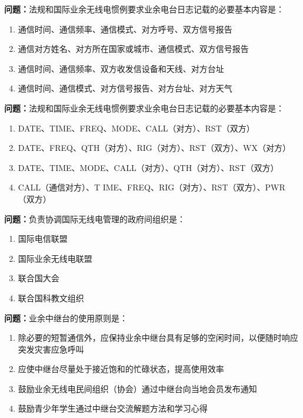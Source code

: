 \bigskip


\noindent\textbf{问题：}法规和国际业余无线电惯例要求业余电台日志记载的必要基本内容是：
\begin{enumerate}[label=\Alph*), leftmargin=3em]
\item 通信时间、通信频率、通信模式、对方呼号、双方信号报告
\item 通信对方姓名、对方所在国家或城市、通信模式、双方信号报告
\item 通信时间、通信频率、双方收发信设备和天线、对方台址
\item 通信时间、通信模式、对方信号报告、对方台址、对方天气
\end{enumerate}

\bigskip


\noindent\textbf{问题：}法规和国际业余无线电惯例要求业余电台日志记载的必要基本内容是：
\begin{enumerate}[label=\Alph*), leftmargin=3em]
\item DATE、TIME、FREQ、MODE、CALL（对方）、RST（双方）
\item DATE、FREQ、QTH（对方）、RIG（对方）、RST（双方）、WX（对方）
\item DATE、TIME、MODE、CALL（对方）、QTH（对方）、RST（双方）
\item CALL（通信对方）、T IME、FREQ、RIG（对方）、RST（双方）、PWR（双方）
\end{enumerate}

\bigskip


\noindent\textbf{问题：}负责协调国际无线电管理的政府间组织是：
\begin{enumerate}[label=\Alph*), leftmargin=3em]
\item 国际电信联盟
\item 国际业余无线电联盟
\item 联合国大会
\item 联合国科教文组织
\end{enumerate}

\bigskip


\noindent\textbf{问题：}业余中继台的使用原则是：
\begin{enumerate}[label=\Alph*), leftmargin=3em]
\item 除必要的短暂通信外，应保持业余中继台具有足够的空闲时间，以便随时响应突发灾害应急呼叫
\item 应使中继台尽量处于接近饱和的忙碌状态，提高使用效率
\item 鼓励业余无线电民间组织（协会）通过中继台向当地会员发布通知
\item 鼓励青少年学生通过中继台交流解题方法和学习心得
\end{enumerate}


